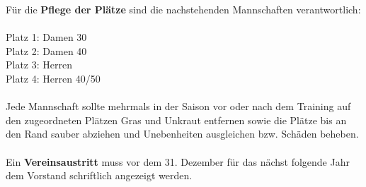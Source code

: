 Für die \textbf{Pflege der Plätze} sind die nachstehenden Mannschaften verantwortlich:\\\\
Platz 1: Damen 30\\
Platz 2: Damen 40\\
Platz 3: Herren\\
Platz 4: Herren 40/50\\\\
Jede Mannschaft sollte mehrmals in der Saison vor oder nach dem Training auf den zugeordneten Plätzen Gras und Unkraut entfernen sowie die Plätze bis an den Rand sauber abziehen und Unebenheiten ausgleichen bzw. Schäden beheben.\\\\
Ein \textbf{Vereinsaustritt} muss vor dem 31. Dezember für das nächst folgende Jahr dem Vorstand schriftlich angezeigt werden.

